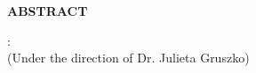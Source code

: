 
\begin{center}
\vspace*{52pt}
{\normalfont\textbf{ABSTRACT}}
\vspace{11pt}

\begin{singlespace}
{\khb}: {\thesistitle}\\
(Under the direction of Dr. Julieta Gruszko)
\end{singlespace}
\end{center}

